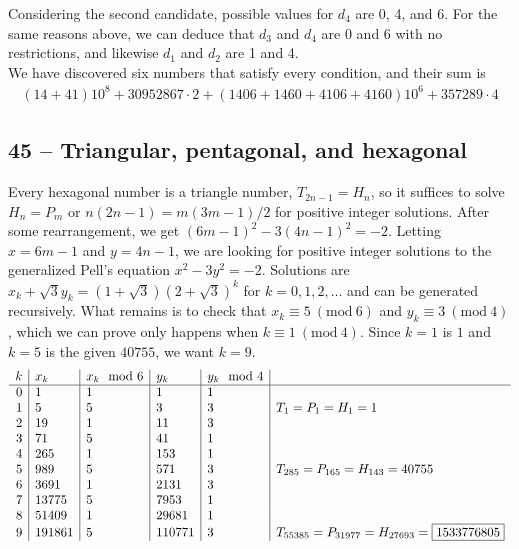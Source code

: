 \documentclass{article}
\newcommand{\Mod}[1]{\ (\mathrm{mod}\ #1)}
\begin{document}
Considering the second candidate, possible values for $d_4$ are 0, 4, and 6. For the same reasons above, we can deduce that $d_3$ and $d_4$ are 0 and 6 with no restrictions, and likewise $d_1$ and $d_2$ are 1 and 4. \\

We have discovered six numbers that satisfy every condition, and their sum is
\begin{align*}
	\boxed{ (14+41)10^8 + 30952867 \cdot 2 + (1406+1460+4106+4160)10^6 + 357289 \cdot 4 }
\end{align*}

\subsection*{45 -- Triangular, pentagonal, and hexagonal}
Every hexagonal number is a triangle number, $T_{2n-1} = H_n$, so it suffices to solve $H_n = P_m$ or $n(2n-1) = m(3m-1)/2$ for positive integer solutions.
After some rearrangement, we get $(6m-1)^2 - 3(4n-1)^2 = -2$.
Letting $x = 6m-1$ and $y = 4n-1$, we are looking for positive integer solutions to the generalized Pell's equation $x^2 - 3y^2 = -2$.
Solutions are $x_k + \sqrt{3} y_k = (1+\sqrt{3})(2+\sqrt{3})^k$ for $k = 0, 1, 2, \dotsc$ and can be generated recursively.
What remains is to check that $x_k \equiv 5 \Mod{6}$ and $y_k \equiv 3 \Mod{4}$, which we can prove only happens when $k \equiv 1 \Mod{4}$.
Since $k =1$ is $1$ and $k=5$ is the given $40755$, we want $k=9$.
\begin{align*}
	\begin{array}{r | l |l | l | l | l}
	k & x_k & x_k \mod 6 & y_k & y_k \mod 4 & \\ \hline
	0 & 1 & 1 & 1 & 1 \\
	1 & 5 & 5 & 3 & 3 & T_1 = P_1 = H_1 = 1\\
	2 & 19 & 1 & 11 & 3 \\
	3 & 71 & 5 & 41 & 1 \\
	4 & 265 & 1 & 153 & 1 \\
	5 & 989 & 5 & 571 & 3 & T_{285} = P_{165} = H_{143} = 40755 \\
	6 & 3691 & 1 & 2131 & 3 \\
	7 & 13775 & 5 & 7953 & 1 \\
	8 & 51409 & 1 & 29681 & 1 \\
	9 & 191861 & 5 & 110771 & 3 & T_{55385} = P_{31977} = H_{27693} = \boxed{1533776805}
	\end{array}
\end{align*}
\end{document}
